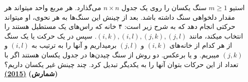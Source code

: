 استیو $m \ge 1$ سنگ یکسان را روی یک جدول $n \times n$ می‌گذارد.
هر مربع واحد میتواند هر مقدار دلخواهی سنگ داشته باشد. 
بعد از چینش این سنگ‌ها به هر نحوی، او میتواند حرکتی انجام دهد که به شرح زیر است:
۴ خانه که راس‌های یک مستطیل هستند را انتخاب میکند، مانند 
$(i, k), (i, l), (j, k), (j, l)$.
سپس در یک حرکت یا یک سنگ از هر کدام از خانه‌های $(i, k)$ و $(j, l)$ برمیداریم و آنها را به ترتیب به $(i, l)$ و $(j, k)$ میبریم. و یا برعکس.
دو روش از سنگ چیدن‌ها در جدول یکسان هستند اگر با تعداد از این حرکات بتوان آنها را به یکدیگر تبدیل کرد.
چند چینش غیر یکسان داریم؟
\textbf{(شمارش)}
\href{https://artofproblemsolving.com/community/c5h1083477p4774079}{\textbf{(2015)}}
